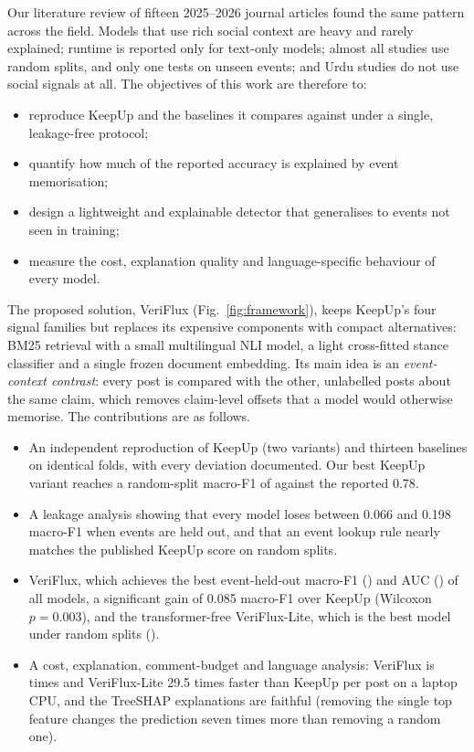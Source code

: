 \documentclass[conference]{IEEEtran}
\begin{document}
Our literature review of fifteen 2025--2026 journal articles found the same pattern across the field. Models
that use rich social context are heavy and rarely explained; runtime is reported only for text-only models;
almost all studies use random splits, and only one tests on unseen events; and Urdu studies do not use social
signals at all. The objectives of this work are therefore to:
\begin{itemize}
\item reproduce KeepUp and the baselines it compares against under a single, leakage-free protocol;
\item quantify how much of the reported accuracy is explained by event memorisation;
\item design a lightweight and explainable detector that generalises to events not seen in training;
\item measure the cost, explanation quality and language-specific behaviour of every model.
\end{itemize}

The proposed solution, VeriFlux (Fig.~\ref{fig:framework}), keeps KeepUp's four signal families but replaces
its expensive components with compact alternatives: BM25 retrieval with a small multilingual NLI model, a
light cross-fitted stance classifier and a single frozen document embedding. Its main idea is an
\emph{event-context contrast}: every post is compared with the other, unlabelled posts about the same claim,
which removes claim-level offsets that a model would otherwise memorise. The contributions are as follows.
\begin{itemize}
\item An independent reproduction of KeepUp (two variants) and thirteen baselines on identical folds, with
every deviation documented. Our best KeepUp variant reaches a random-split macro-F1 of \KUseqrandomFone{} against
the reported 0.78.
\item A leakage analysis showing that every model loses between 0.066 and 0.198 macro-F1 when events are held
out, and that an event lookup rule nearly matches the published KeepUp score on random splits.
\item VeriFlux, which achieves the best event-held-out macro-F1 (\VFeventFone{}) and AUC (\VFeventAuc{}) of
all models, a significant gain of 0.085 macro-F1 over KeepUp (Wilcoxon $p=0.003$), and the transformer-free
VeriFlux-Lite, which is the best model under random splits (\VFLrandomFone{}).
\item A cost, explanation, comment-budget and language analysis: VeriFlux is \LatencyRatio{} times and
VeriFlux-Lite 29.5 times faster than KeepUp per post on a laptop CPU, and the TreeSHAP explanations are
faithful (removing the single top feature changes the prediction seven times more than removing a random one).
\end{itemize}
\end{document}
